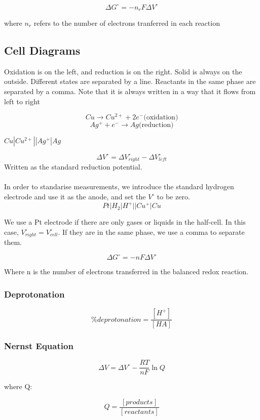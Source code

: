 \documentclass{article}
\begin{document}
\[
\Delta G^{\circ} = - n_r F \Delta V^{\circ}
\]

where $n_r$ refers to the number of electrons tranferred in each reaction

\subsection{Cell Diagrams}

Oxidation is on the left, and reduction is on the right. Solid is always on the outside. Different states are separated by a line. Reactants in the same phase are separated by a comma. Note that it is always written in a way that it flows from left to right

\[
Cu \rightarrow Cu^{2+} + 2e^- \text{(oxidation)}
\]
\[
Ag^+ + e^- \rightarrow Ag \text{(reduction)}
\]

\begin{center}
$Cu|Cu^{2+}||Ag^{+}|Ag$
\end{center}

\[
\Delta V^{\circ} = \Delta V^{\circ}_{right} - \Delta V^{\circ}_{left}
\]
Written as the standard reduction potential.
\\
\\
In order to standarise measurements, we introduce the standard hydrogen electrode and use it as the anode, and set the $V^{\circ}$ to be zero.
\[
Pt|H_2|H^+||Cu^{+}|Cu
\]

We use a Pt electrode if there are only gases or liquids in the half-cell. In this case, $V^{\circ}_{right} = V^{\circ}_{cell}$. If they are in the same phase, we use a comma to separate them.

\[
\Delta G^{\circ} = - nF \Delta V^{\circ}
\]

Where n is the number of electrons transferred in the balanced redox reaction. 

\subsubsection{Deprotonation}

\[
\% deprotonation = \frac{[H^+]}{[HA]}
\]

\subsubsection{Nernst Equation}
\[
\Delta V = \Delta V^{\circ} - \frac{RT}{nF} \ln Q
\]

where Q:

\[
Q = \frac{[products]}{[reactants]}
\]
\end{document}
